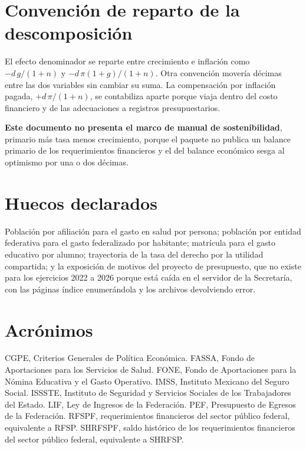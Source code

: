 \section*{Convención de reparto de la descomposición}

El efecto denominador se reparte entre crecimiento e inflación como
$-d\,g/(1+n)$ y $-d\,\pi(1+g)/(1+n)$. Otra convención movería décimas entre las
dos variables sin cambiar su suma. La compensación por inflación pagada,
$+d\,\pi/(1+n)$, se contabiliza aparte porque viaja dentro del costo financiero y
de las adecuaciones a registros presupuestarios.

\textbf{Este documento no presenta el marco de manual de sostenibilidad}, primario
más tasa menos crecimiento, porque el paquete no publica un balance primario de
los requerimientos financieros y el del balance económico sesga al optimismo por
una o dos décimas.

\section*{Huecos declarados}

Población por afiliación para el gasto en salud por persona; población por entidad
federativa para el gasto federalizado por habitante; matrícula para el gasto
educativo por alumno; trayectoria de la tasa del derecho por la utilidad
compartida; y la exposición de motivos del proyecto de presupuesto, que no existe
para los ejercicios 2022 a 2026 porque está caída en el servidor de la Secretaría,
con las páginas índice enumerándola y los archivos devolviendo error.

\section*{Acrónimos}

CGPE, Criterios Generales de Política Económica. FASSA, Fondo de Aportaciones para
los Servicios de Salud. FONE, Fondo de Aportaciones para la Nómina Educativa y el
Gasto Operativo. IMSS, Instituto Mexicano del Seguro Social. ISSSTE, Instituto de
Seguridad y Servicios Sociales de los Trabajadores del Estado. LIF, Ley de
Ingresos de la Federación. PEF, Presupuesto de Egresos de la Federación. RFSPF,
requerimientos financieros del sector público federal, equivalente a RFSP. SHRFSPF,
saldo histórico de los requerimientos financieros del sector público federal,
equivalente a SHRFSP.


